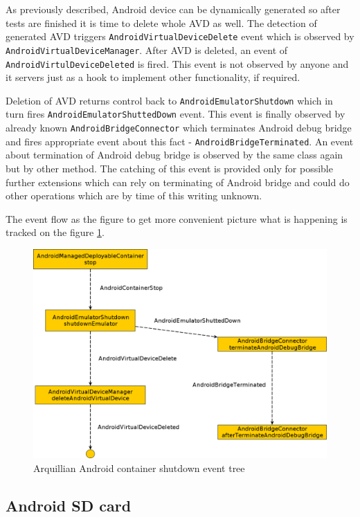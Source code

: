 \documentclass[12pt,final,oneside]{fithesis}
\begin{document}
As previously described, Android device can be dynamically generated so after tests are finished it is time to delete whole AVD as well. The detection of generated AVD triggers \texttt{AndroidVirtualDeviceDelete} event which is observed by \texttt{AndroidVirtualDeviceManager}. After AVD is deleted, an event of \texttt{AndroidVirtulDeviceDeleted} is fired. This event is not observed by anyone and it servers just as a hook to implement other functionality, if required.

Deletion of AVD returns control back to \texttt{AndroidEmulatorShutdown} which in turn fires \texttt{AndroidEmulatorShuttedDown} event. This event is finally observed by already known \texttt{AndroidBridgeConnector} which terminates Android debug bridge and fires appropriate event about this fact - \texttt{AndroidBridgeTerminated}. An event about termination of Android debug bridge is observed by the same class again but by other method. The catching of this event is provided only for possible further extensions which can rely on terminating of Android bridge and could do other operations which are by time of this writing unknown.

The event flow as the figure to get more convenient picture what is happening is tracked on the figure \ref{fig:container_shutdown}.

\begin{figure}[!ht]
	\centering
	\includegraphics[width=120mm]{img/container-shutdown.png}
	\caption{Arquillian Android container shutdown event tree}
	\label{fig:container_shutdown}
\end{figure}

		\subsection{Android SD card}
	
\end{document}
